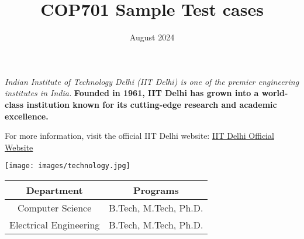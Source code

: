 \documentclass{article}
\title{COP701 Sample Test cases}
\date{August 2024}
\begin{document}
\textit{Indian Institute of Technology Delhi (IIT Delhi) is one of the premier engineering institutes in India.}
\textbf{Founded in 1961, IIT Delhi has grown into a world-class institution known for its cutting-edge research and academic excellence.}


For more information, visit the official IIT Delhi website: \href{https://www.iitd.ac.in}{IIT Delhi Official Website}

\texttt{[image: images/technology.jpg]}

\begin{tabular}{|c|c|}
    \hline
    Department & Programs \\
    \hline
    Computer Science & B.Tech, M.Tech, Ph.D. \\
    Electrical Engineering & B.Tech, M.Tech, Ph.D. \\
    \hline
\end{tabular}
\end{document}
